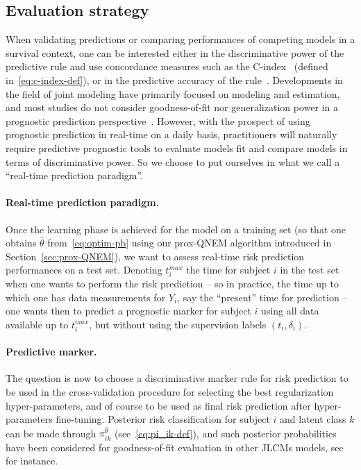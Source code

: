 \documentclass[11pt]{article}
\begin{document}
\subsection{Evaluation strategy}
\label{sec:evaluation strategy}

When validating predictions or comparing performances of competing models in a survival context, one can be interested either in the discriminative power of the predictive rule and use concordance measures such as the C-index~\citep{heagerty2005survival} (defined in~\eqref{eq:c-index-def}), or in the predictive accuracy of the rule~\citep{schemper2000predictive}.
Developments in the field of joint modeling have primarily focused on modeling and estimation, and most studies do not consider goodness-of-fit nor generalization power in a prognostic prediction perspective~\citep{hickey2016joint}. However, with the prospect of using prognostic prediction in real-time on a daily basis, practitioners will naturally require predictive prognostic tools to evaluate models fit and compare models in terms of discriminative power. So we choose to put ourselves in what we call a ``real-time prediction paradigm''. 

\paragraph{Real-time prediction paradigm.}

Once the learning phase is achieved for the model on a training set (so that one obtains $\hat\theta$ from~\eqref{eq:optim-pb} using our prox-QNEM algorithm introduced in Section~\ref{sec:prox-QNEM}), we want to assess real-time risk prediction performances on a test set.
Denoting $t^{max}_i$ the time for subject $i$ in the test set when one wants to perform the risk prediction -- so in practice, the time up to which one has data measurements for $Y_i$, say the ``present'' time for prediction -- one wants then to predict a prognostic marker for subject $i$ using all data available up to $t^{max}_i$, but without using the supervision labels $(t_i, \delta_i)$.

\paragraph{Predictive marker.}

The question is now to choose a discriminative marker rule for risk prediction to be used in the cross-validation procedure for selecting the best regularization hyper-parameters, and of course to be used as final risk prediction after hyper-parameters fine-tuning.
Posterior risk classification for subject $i$ and latent class $k$ can be made through $\pi_{ik}^{\hat\theta}$ (see~\eqref{eq:pi_ik-def}), and such posterior probabilities have been considered for goodness-of-fit evaluation in other JLCMs models, see~\citet{proust2014joint} for instance.
\end{document}
